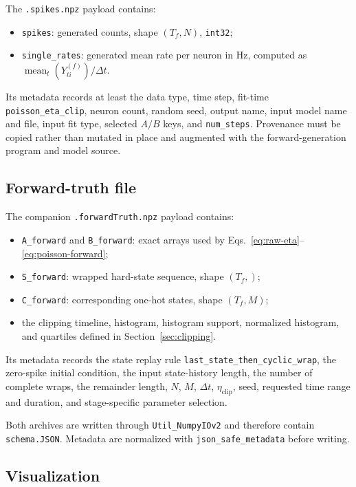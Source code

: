 \documentclass[11pt]{article}
\begin{document}
The \texttt{.spikes.npz} payload contains:
\begin{itemize}
  \item \texttt{spikes}: generated counts, shape \((T_f,N)\),
        \texttt{int32};
  \item \texttt{single\_rates}: generated mean rate per neuron in Hz,
        computed as \(\operatorname{mean}_t(Y^{(f)}_{ti})/\Delta t\).
\end{itemize}

Its metadata records at least the data type, time step, fit-time
\texttt{poisson\_eta\_clip}, neuron count, random seed, output name, input
model name and file, input fit type, selected \(A/B\) keys, and
\texttt{num\_steps}. Provenance must be copied rather than mutated in place
and augmented with the forward-generation program and model source.

\subsection{Forward-truth file}

The companion \texttt{.forwardTruth.npz} payload contains:
\begin{itemize}
  \item \texttt{A\_forward} and \texttt{B\_forward}: exact arrays used by
        Eqs.~\eqref{eq:raw-eta}--\eqref{eq:poisson-forward};
  \item \texttt{S\_forward}: wrapped hard-state sequence, shape
        \((T_f,)\);
  \item \texttt{C\_forward}: corresponding one-hot states, shape
        \((T_f,M)\);
  \item the clipping timeline, histogram, histogram support, normalized
        histogram, and quartiles defined in Section~\ref{sec:clipping}.
\end{itemize}

Its metadata records the state replay rule
\texttt{last\_state\_then\_cyclic\_wrap}, the zero-spike initial condition,
the input state-history length, the number of complete wraps, the remainder
length, \(N\), \(M\), \(\Delta t\), \(\eta_{\mathrm{clip}}\), seed, requested
time range and duration, and stage-specific parameter selection.

Both archives are written through \texttt{Util\_NumpyIOv2} and therefore
contain \texttt{schema.JSON}. Metadata are normalized with
\texttt{json\_safe\_metadata} before writing.

\subsection{Visualization}
\end{document}
